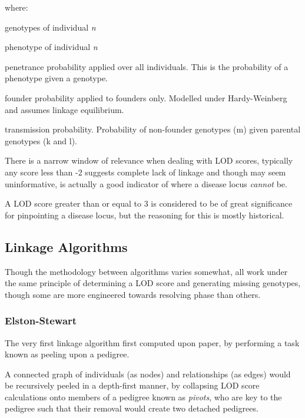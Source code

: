 where:
\begin{spacing}{1}
\begin{description}[labelsep=2em, align=right, labelwidth=3em, labelindent=4em, leftmargin=*]
\item[\(g_n\)]{genotypes of individual \textit{n}}
\item[\(Y_n\)]{phenotype of individual \textit{n}}
\item[\(P(Y_i|g_i)\)]{penetrance probability applied over all individuals. This is the probability of a phenotype given a genotype.}
\item[\(P(g_j)\)]{founder probability applied to founders only. Modelled under Hardy-Weinberg and assumes linkage equilibrium.}
\item[\(P(g_m|g_k,g_l)\)]{transmission probability. Probability of non-founder genotypes (m) given parental genotypes (k and l).}
\end{description}
\end{spacing}


There is a narrow window of relevance when dealing with LOD scores, typically any score less than -2 suggests complete lack of linkage and though may seem uninformative, is actually a good indicator of where a disease locus \textit{cannot} be.

A LOD score greater than or equal to 3 is considered to be of great significance for pinpointing a disease locus, but the reasoning for this is mostly historical.

\subsection{Linkage Algorithms}

Though the methodology between algorithms varies somewhat, all work under the same principle of determining a LOD score and generating missing genotypes, though some are more engineered towards resolving phase than others.

\subsubsection{Elston-Stewart}

The very first linkage algorithm first computed upon paper, by performing a task known as peeling upon a \gls{pedigree}.

A connected graph of individuals (as nodes) and relationships (as edges) would be recursively peeled in a depth-first manner, by collapsing LOD score calculations onto members of a pedigree known as \textit{pivots}, who are key to the pedigree such that their removal would create two detached pedigrees. 

